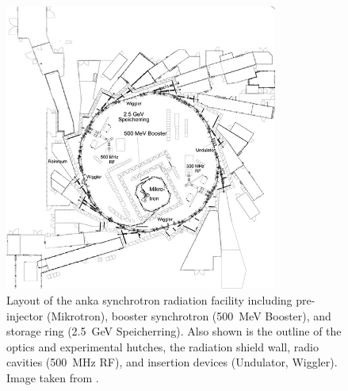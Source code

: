 \documentclass[
twoside,
openright,
titlepage,
numbers=noenddot,
headinclude,
fleqn,
a4paper,
footinclude=true,
cleardoublepage=empty,
abstractoff,
BCOR=5mm,
paper=a4,
fontsize=11pt,
british,ngerman,american,
]{scrreprt}
\begin{document}
\begin{figure}
  \centering
  \includegraphics[width=0.8\textwidth]
  {figures/Synchrotron/SynchrotronLayout-ANKA}
  \caption[Layout of the \ac{anka} synchrotron radiation
  facility.]{Layout of the \ac{anka} synchrotron radiation facility
    including pre-injector (Mikrotron), booster synchrotron
    (\SI{500}{MeV} Booster), and storage ring (\SI{2.5}{GeV}
    Speicherring).  Also shown is the outline of the optics and
    experimental hutches, the radiation shield wall, radio cavities
    (\SI{500}{MHz} RF), and insertion devices (Undulator, Wiggler).
    Image taken from \cite{ANKAInstrBook2012}.}
  \label{fig:anka}
\end{figure}
\end{document}
